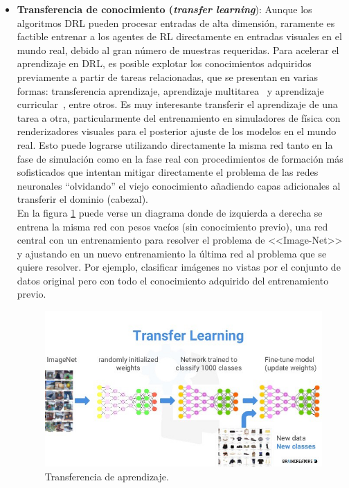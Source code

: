 \begin{itemize}
    \item \textbf{Transferencia de conocimiento (\textit{transfer learning}}): Aunque los algoritmos DRL pueden procesar entradas de alta dimensión, raramente es factible entrenar a los agentes de RL directamente en entradas visuales en el mundo real, debido al gran número de muestras requeridas. Para acelerar el aprendizaje en DRL, es posible explotar los conocimientos adquiridos previamente a partir de tareas relacionadas, que se presentan en varias formas: transferencia aprendizaje, aprendizaje multitarea~\cite{eric_tzeng} y aprendizaje curricular~\cite{ronan_collobert}, entre otros. Es muy interesante transferir el aprendizaje de una tarea a otra, particularmente del entrenamiento en simuladores de física con renderizadores visuales para el posterior ajuste de los modelos en el mundo real. Esto puede lograrse utilizando directamente la misma red tanto en la fase de simulación como en la fase real con procedimientos de formación más sofisticados que intentan mitigar directamente el problema de las redes neuronales ``olvidando'' el viejo conocimiento añadiendo capas adicionales al transferir el dominio (cabezal).\\
    
    En la figura \ref{fig:transfer-learning} puede verse un diagrama donde de izquierda a derecha se entrena la misma red con pesos vacíos (sin conocimiento previo), una red central con un entrenamiento para resolver el problema de <<Image-Net>> y ajustando en un nuevo entrenamiento la última red al problema que se quiere resolver. Por ejemplo, clasificar imágenes no vistas por el conjunto de datos original pero con todo el conocimiento adquirido del entrenamiento previo. 
     
    \begin{figure}[!ht]
        \centering \includegraphics[width=0.7\columnwidth]{./figures/chapter_2/transfer-learning.jpeg}
        \caption{Transferencia de aprendizaje.}\label{fig:transfer-learning}
    \end{figure}
\end{itemize}




